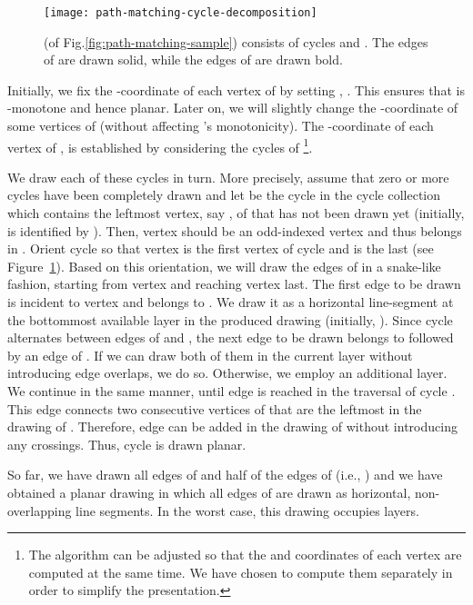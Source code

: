 \documentclass{llncs}
\begin{document}
\begin{figure}[t!hb]
  \centering
  \texttt{[image: path-matching-cycle-decomposition]}
  \caption{ (of Fig.\ref{fig:path-matching-sample})
  consists of cycles  and . The edges of 
  are drawn solid, while the edges of  are drawn bold.}
  \label{fig:path-matching-cycle-decomposition}
\end{figure}

Initially, we fix the -coordinate of each vertex of 
by setting , . This ensures that
 is -monotone and hence planar. Later on, we will
slightly change the -coordinate of some vertices of 
(without affecting 's monotonicity). The -coordinate
of each vertex of , is established by considering the
cycles of \footnote{The
algorithm can be adjusted so that the  and  coordinates of
each vertex are computed at the same time. We have chosen to compute
them separately in order to simplify the presentation.}.

We draw each of these cycles in turn. More precisely, assume that
zero or more cycles have been completely drawn and let 
be the cycle in the cycle collection which contains the leftmost
vertex, say , of  that has not been drawn yet
(initially,  is identified by ). Then, vertex  should
be an odd-indexed vertex and thus  belongs in
. Orient cycle  so that vertex  is
the first vertex of cycle  and  is the last
(see Figure~\ref{fig:path-matching-cycle-decomposition}). Based on
this orientation, we will draw the edges of  in a
snake-like fashion, starting from vertex  and reaching vertex
 last. The first edge to be drawn is incident to vertex
 and belongs to . We draw it as a horizontal
line-segment at the bottommost available layer in the produced
drawing (initially, ). Since cycle  alternates
between edges of  and , the next
edge to be drawn belongs to  followed by an edge
of . If we can draw both of them in the current layer
without introducing edge overlaps, we do so. Otherwise, we employ an
additional layer. We continue in the same manner, until edge
 is reached in the traversal of cycle .
This edge connects two consecutive vertices of  that
are the leftmost in the drawing of . Therefore, edge
 can be added in the drawing of  without
introducing any crossings. Thus, cycle  is drawn
planar.

So far, we have drawn all edges of  and half of the
edges of  (i.e., ) and we have
obtained a planar drawing in which all edges of  are
drawn as horizontal, non-overlapping line segments. In the worst
case, this drawing occupies  layers.
\end{document}
